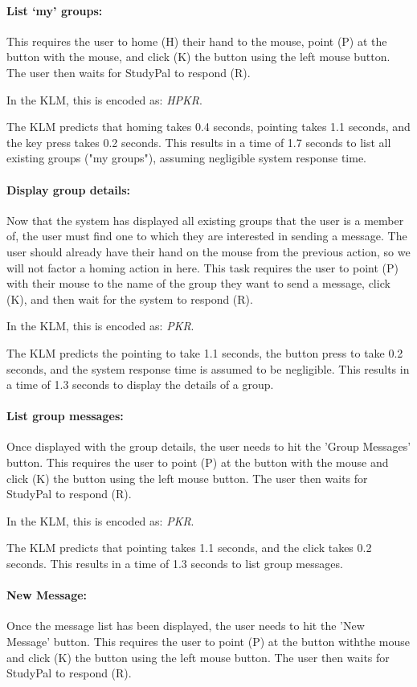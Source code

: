 \documentclass[conference]{IEEEtran}
\begin{document}
\paragraph{List `my' groups:}
This requires the user to home (H) their hand to the mouse, point (P) at the button with the mouse, and click (K) the button using the left mouse button.
The user then waits for StudyPal to respond (R).

In the KLM, this is encoded as: \emph{HPKR}.

The KLM predicts that homing takes 0.4 seconds, pointing takes 1.1 seconds, and the key press takes 0.2 seconds.
This results in a time of 1.7 seconds to list all existing groups ("my groups"), assuming negligible system response time.

\paragraph{Display group details:}
Now that the system has displayed all existing groups that the user is a member of, the user must find one to which they are interested in sending a message.
The user should already have their hand on the mouse from the previous action, so we will not factor a homing action in here.
This task requires the user to point (P) with their mouse to the name of the group they want to send a message, click (K), and then wait for the system to respond (R).

In the KLM, this is encoded as: \emph{PKR}.

The KLM predicts the pointing to take 1.1 seconds, the button press to take 0.2 seconds, and the system response time is assumed to be negligible.
This results in a time of 1.3 seconds to display the details of a group.

\paragraph{List group messages:}
Once displayed with the group details, the user needs to hit the 'Group Messages' button. This requires the user to point (P) at the button with the mouse and click (K) the button using the left mouse button. The user then waits for StudyPal to respond (R).

In the KLM, this is encoded as: \emph{PKR}.

The KLM predicts that pointing takes 1.1 seconds, and the click takes 0.2 seconds.
This results in a time of 1.3 seconds to list group messages.

\paragraph{New Message:}
Once the message list has been displayed, the user needs to hit the 'New Message' button. This requires the user to point (P) at the button withthe mouse and click (K) the button using the left mouse button. The user then waits for StudyPal to respond (R).
\end{document}
